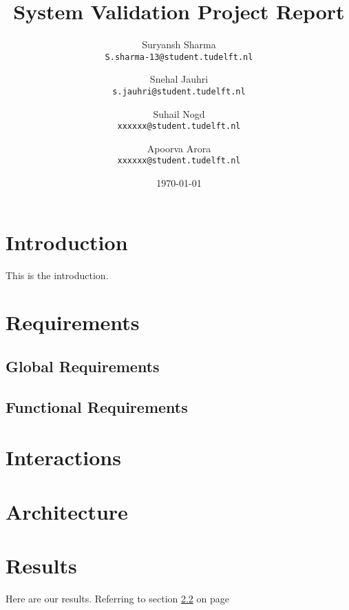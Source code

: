 \documentclass[a4paper,12pt]{article}
\begin{document}
\title{System Validation Project Report}
\author{
	Suryansh Sharma \\ 
	\texttt{S.sharma-13@student.tudelft.nl}
 	\and 
	Snehal Jauhri \\
	\texttt{s.jauhri@student.tudelft.nl} 
	\and
	Suhail Nogd \\
	\texttt{xxxxxx@student.tudelft.nl} 	
	 \and 
	Apoorva Arora\\
	\texttt{xxxxxx@student.tudelft.nl} 
}

\date {\today}
\maketitle

\section{Introduction}
This is the introduction.

\section{Requirements}

\subsection{Global Requirements}
\label{sec1}

\subsection{Functional Requirements}
\label{sec1}

\section{Interactions} 

\section{Architecture}

\section{Results}
Here are our results. Referring to section \ref{sec1} on page \pageref{sec1}
\end{document}
